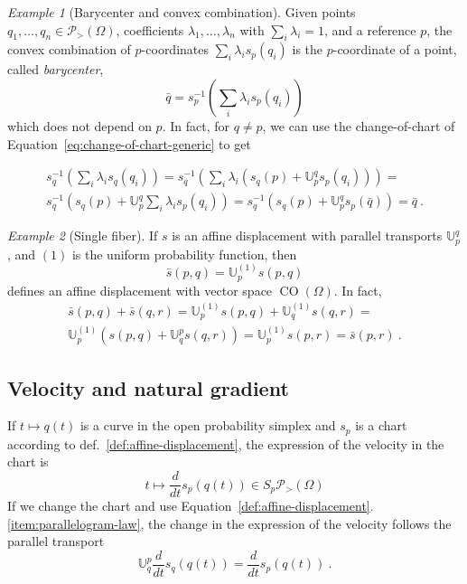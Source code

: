 \documentclass[axioms,article,submit,pdftex,moreauthors]{Definitions/mdpi}
\theoremstyle{plain}
\theoremstyle{remark}
\newtheorem{myexample}{Example}
\newcommand{\contrastson}[1]{\operatorname{CO}\left(#1\right)}
\newcommand{\derivby}[1]{\frac{d}{d#1}}
\newcommand{\expfibreat}[2]{S_{#1}\pdensitieson{#2}}
\newcommand{\pdensitieson}[1]{\mathcal P_{>}\left(#1\right)}
\newcommand{\transport}[2]{{\mathbb U} _ {#1} ^ {#2}}
\begin{document}
\begin{myexample}[Barycenter and convex combination]
Given points $q_1,\dots,q_n \in \pdensitieson\Omega$, coefficients $\lambda_1, \dots, \lambda _n$ with $\sum_i \lambda_i = 1$, and a reference $p$, the convex combination of $p$-coordinates $\sum_i \lambda_i s_p(q_i)$ is the $p$-coordinate of a point, called \emph{barycenter}, 
\begin{equation} \label{eq:barycenter}
\bar q = s_p^{-1}\left(\sum_i \lambda_i s_p(q_i)\right)
\end{equation}
which does not depend on $p$. In fact, for $q \neq p$, we can use the change-of-chart of Equation~\eqref{eq:change-of-chart-generic} to get

\begin{multline*}
s_q^{-1}\left(\sum_i \lambda_i s_q(q_i)\right) 
= s_q^{-1}\left(\sum_i \lambda_i \left(s_q(p) + \transport{p}{q} s_p(q_i)\right) \right) 
= \\ s_q^{-1}\left(s_q(p) + \transport{p}{q} \sum_i \lambda_i s_p(q_i) \right)
= s_q^{-1}\left(s_q(p) + \transport{p}{q} s_p(\bar q) \right) = \bar q \ .
\end{multline*}
\end{myexample}

\begin{myexample}[Single fiber] \label{ex:single-fiber} 
If $s$ is an affine displacement with parallel transports $\transport p q$, and $(1)$ is the uniform probability function, then
\begin{equation*}
    \bar s(p,q) = \transport p {(1)} s(p,q)
\end{equation*}
defines an affine displacement with vector space $\contrastson\Omega$. In fact,
\begin{multline*}
    \bar s(p,q) + \bar s(q,r) = \transport p {(1)} s(p,q) + \transport q {(1)} s(q,r) = \\ \transport p {(1)} \left(s(p,q) + \transport q p s(q,r) \right) = \transport p {(1)} s(p,r) = \bar s(p,r) \ .
\end{multline*}
\end{myexample}

\subsection{Velocity and natural gradient} 

If $t \mapsto q(t)$ is a curve in the open probability simplex and $s_p$ is a chart according to def.~\ref{def:affine-displacement}, the expression of the velocity in the chart is 
\begin{equation*}
    t \mapsto \derivby t s_p(q(t)) \in \expfibreat {p} \Omega
\end{equation*}
If we change the chart and use Equation~\ref{def:affine-displacement}.\ref{item:parallelogram-law}, the change in the expression of the velocity follows the parallel transport
\begin{equation*}
  \transport q p  \derivby t s_q(q(t)) = \derivby t s_p(q(t)) \ .
\end{equation*}
\end{document}
